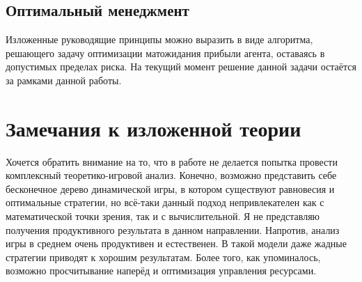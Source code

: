 	\subsection*{Оптимальный менеджмент}
	
	Изложенные руководящие принципы можно выразить в виде алгоритма, решающего задачу оптимизации матожидания прибыли агента, оставаясь в допустимых пределах риска. На текущий момент решение данной задачи остаётся за рамками данной работы.
	
	\section{Замечания к изложенной теории}
	
	Хочется обратить внимание на то, что в работе не делается попытка провести комплексный теоретико-игровой анализ. Конечно, возможно представить себе бесконечное дерево динамической игры, в котором существуют равновесия и оптимальные стратегии, но всё-таки данный подход непривлекателен как с математической точки зрения, так и с вычислительной. Я не представляю получения продуктивного результата в данном направлении. Напротив, анализ игры в среднем очень продуктивен и естественен. В такой модели даже жадные стратегии приводят к хорошим результатам. Более того, как упоминалось, возможно просчитывание наперёд и оптимизация управления ресурсами.
	









